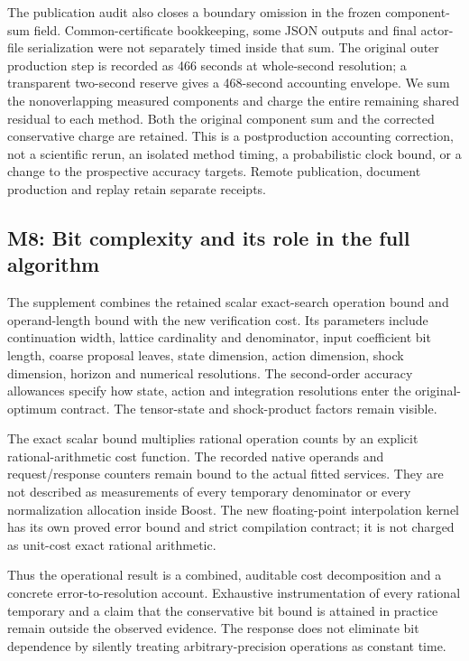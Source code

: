 \documentclass[ecta,nameyear,draft]{econsocart}
\begin{document}
The publication audit also closes a boundary omission in the frozen
component-sum field. Common-certificate bookkeeping, some JSON outputs
and final actor-file serialization were not separately timed inside that
sum. The original outer production step is recorded as 466 seconds at
whole-second resolution; a transparent two-second reserve gives a
468-second accounting envelope. We sum the nonoverlapping measured
components and charge the entire remaining shared residual to each
method. Both the original component sum and the corrected conservative
charge are retained. This is a postproduction accounting correction, not
a scientific rerun, an isolated method timing, a probabilistic clock
bound, or a change to the prospective accuracy targets. Remote
publication, document production and replay retain separate receipts.

\hypertarget{m8-bit-complexity-and-its-role-in-the-full-algorithm}{%
\subsection{M8: Bit complexity and its role in the full
algorithm}\label{m8-bit-complexity-and-its-role-in-the-full-algorithm}}

The supplement combines the retained scalar exact-search operation bound
and operand-length bound with the new verification cost. Its parameters
include continuation width, lattice cardinality and denominator, input
coefficient bit length, coarse proposal leaves, state dimension, action
dimension, shock dimension, horizon and numerical resolutions. The
second-order accuracy allowances specify how state, action and
integration resolutions enter the original-optimum contract. The
tensor-state and shock-product factors remain visible.

The exact scalar bound multiplies rational operation counts by an
explicit rational-arithmetic cost function. The recorded native operands
and request/response counters remain bound to the actual fitted
services. They are not described as measurements of every temporary
denominator or every normalization allocation inside Boost. The new
floating-point interpolation kernel has its own proved error bound and
strict compilation contract; it is not charged as unit-cost exact
rational arithmetic.

Thus the operational result is a combined, auditable cost decomposition
and a concrete error-to-resolution account. Exhaustive instrumentation
of every rational temporary and a claim that the conservative bit bound
is attained in practice remain outside the observed evidence. The
response does not eliminate bit dependence by silently treating
arbitrary-precision operations as constant time.
\end{document}

